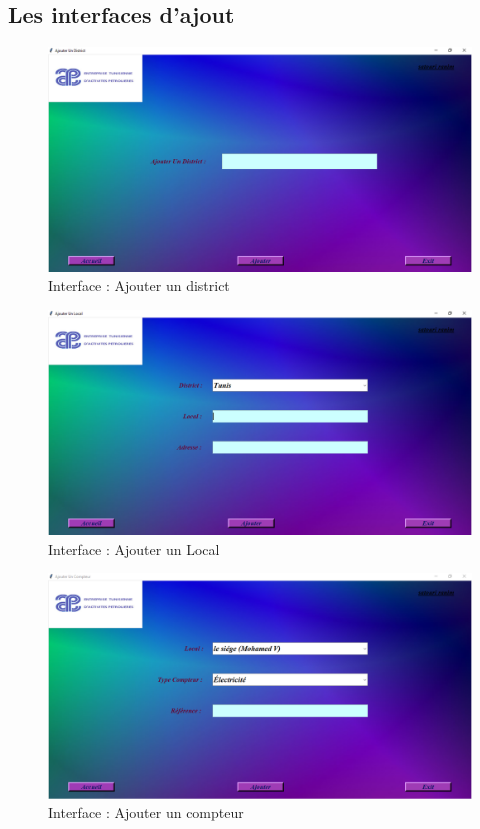 \documentclass[12pt]{report}
\begin{document}
\subsection{Les interfaces d'ajout }
\begin{figure}[H]
  \centering
  \includegraphics[scale=0.47]{add_district}
  \caption{Interface : Ajouter un district}
  \label{fig:votre-label}
\end{figure}
\begin{figure}[H]
  \centering
  \includegraphics[scale=0.47]{add_local}
  \caption{Interface : Ajouter un Local}
  \label{fig:votre-label}
\end{figure}
\begin{figure}[H]
  \centering
  \includegraphics[scale=0.47]{add_compteur}
  \caption{Interface : Ajouter un compteur}
  \label{fig:votre-label}
\end{figure}
\end{document}
